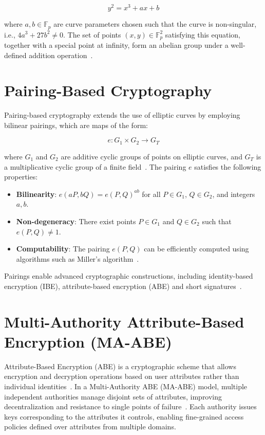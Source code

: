 \documentclass[cic,tc,english]{iiufrgs}
\begin{document}
        \begin{equation}
        \label{eq:elliptic_curve}
        y^2 = x^3 + ax + b
        \end{equation}

        where $a, b \in \mathbb{F}_p$ are curve parameters chosen such that the curve is non-singular, i.e., $4a^3 + 27b^2 \neq 0$. The set of points $(x, y) \in \mathbb{F}_p^2$ satisfying this equation, together with a special point at infinity, form an abelian group under a well-defined addition operation~\citep{hankerson2004guide}.

    \section{Pairing-Based Cryptography}
        \label{sec:pairing}

        Pairing-based cryptography extends the use of elliptic curves by employing bilinear pairings, which are maps of the form:

        \begin{equation}
        e: G_1 \times G_2 \rightarrow G_T
        \end{equation}

        where $G_1$ and $G_2$ are additive cyclic groups of points on elliptic curves, and $G_T$ is a multiplicative cyclic group of a finite field~\citep{boneh2001identity}. The pairing $e$ satisfies the following properties:

        \begin{itemize}
            \item \textbf{Bilinearity}: $e(aP, bQ) = e(P, Q)^{ab}$ for all $P \in G_1$, $Q \in G_2$, and integers $a, b$.
            \item \textbf{Non-degeneracy}: There exist points $P \in G_1$ and $Q \in G_2$ such that $e(P, Q) \neq 1$.
            \item \textbf{Computability}: The pairing $e(P, Q)$ can be efficiently computed using algorithms such as Miller's algorithm~\citep{miller1986use}.
        \end{itemize}

        Pairings enable advanced cryptographic constructions, including identity-based encryption (IBE), attribute-based encryption (ABE) and short signatures~\citep{boneh2001identity}.

    \section{Multi-Authority Attribute-Based Encryption (MA-ABE)}
        \label{sec:maabe}
        Attribute-Based Encryption (ABE) is a cryptographic scheme that allows encryption and decryption operations based on user attributes rather than individual identities~\citep{goyal2006attribute}. In a Multi-Authority ABE (MA-ABE) model, multiple independent authorities manage disjoint sets of attributes, improving decentralization and resistance to single points of failure~\citep{chase2007multi}. Each authority issues keys corresponding to the attributes it controls, enabling fine-grained access policies defined over attributes from multiple domains.
        
\end{document}
